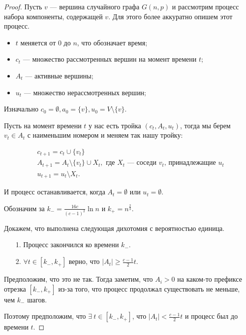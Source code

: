 \begin{proof}
  Пусть $v$ --- вершина случайного графа $G(n, p)$ и рассмотрим процесс набора
  компоненты, содержащей $v$. Для этого более аккуратно опишем этот процесс.

  \begin{itemize}
    \item $t$ меняется от 0 до $n$, что обозначает время;
    \item $c_t$ --- множество рассмотренных вершин на момент времени $t$;
    \item $A_t$ --- активные вершины;
    \item $u_t$ --- множество нерассмотренных вершин;
  \end{itemize}

  Изначально $c_0 = \emptyset, a_0 = \{v\}, u_0 = V \setminus \{v\}$.

  Пусть на момент времени $t$ у нас есть тройка $(c_t, A_t, u_t)$, тогда мы 
  берем $v_t \in A_t$ с наименьшим номером и меняем так нашу тройку:

  \begin{align}
    &c_{t + 1} = c_t \cup \{v_t\}\\
    &A_{t + 1} = A_t \setminus \{v_t\} \cup X_t, \text{ где $X_t$ --- соседи 
    $v_t$, принадлежащие $u_t$}\\
    &u_{t + 1} = u_t \setminus X_t.
  \end{align}

  И процесс останавливается, когда $A_t = \emptyset$ или $u_t = \emptyset$.

  Обозначим за $k_- = \frac{16c}{(c - 1)^2}\ln n$ и $k_+ = n^{\frac23}$.

  Докажем, что выполнена следующая дихотомия с вероятностью единица.

  \begin{itemize}
    \item[1.] Процесс закончился ко времени $k_-$.
    \item[2.] $\forall t \in [k_-, k_+]$ верно, что $|A_t| \geq \frac{c - 1}{2} t$.
  \end{itemize}

  Предположим, что это не так. Тогда
  заметим, что $A_i > 0$ на каком-то префиксе отрезка $[k_-, k_+]$ из-за того, 
  что процесс продолжал существовать не меньше, чем $k_-$ шагов.

  Поэтому предположим, что $\exists \ t \in [k_-, k_+]$, что 
  $|A_t| < \frac{c - 1}{2} t$ и процесс был до времени $t$.


\end{proof}
